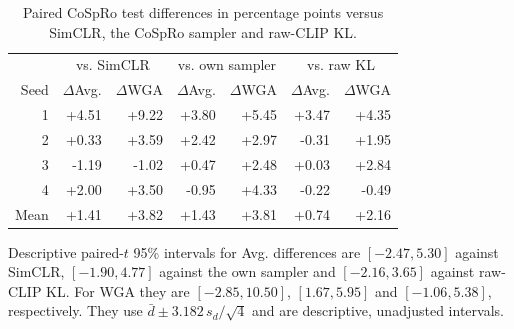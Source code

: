 \documentclass{article}
\begin{document}
\begin{table}[htbp]
\centering\small
\setlength{\tabcolsep}{4pt}
\caption{Paired CoSpRo test differences in percentage points versus SimCLR, the CoSpRo sampler and raw-CLIP KL.}
\begin{tabular}{rrrrrrr}
\toprule
& \multicolumn{2}{c}{vs. SimCLR} & \multicolumn{2}{c}{vs. own sampler} & \multicolumn{2}{c}{vs. raw KL} \\ Seed & $\Delta$Avg. & $\Delta$WGA & $\Delta$Avg. & $\Delta$WGA & $\Delta$Avg. & $\Delta$WGA \\
\midrule
1 & +4.51 & +9.22 & +3.80 & +5.45 & +3.47 & +4.35 \\
2 & +0.33 & +3.59 & +2.42 & +2.97 & -0.31 & +1.95 \\
3 & -1.19 & -1.02 & +0.47 & +2.48 & +0.03 & +2.84 \\
4 & +2.00 & +3.50 & -0.95 & +4.33 & -0.22 & -0.49 \\
\midrule
Mean & +1.41 & +3.82 & +1.43 & +3.81 & +0.74 & +2.16 \\
\bottomrule
\end{tabular}
\label{tab:testpaired}
\end{table}

Descriptive paired-$t$ 95\% intervals for Avg. differences are
$[-2.47,5.30]$ against SimCLR, $[-1.90,4.77]$ against the own sampler and
$[-2.16,3.65]$ against raw-CLIP KL. For WGA they are $[-2.85,10.50]$,
$[1.67,5.95]$ and $[-1.06,5.38]$, respectively. They use
$\bar d\pm3.182\,s_d/\sqrt{4}$ and are descriptive, unadjusted intervals.
\end{document}
